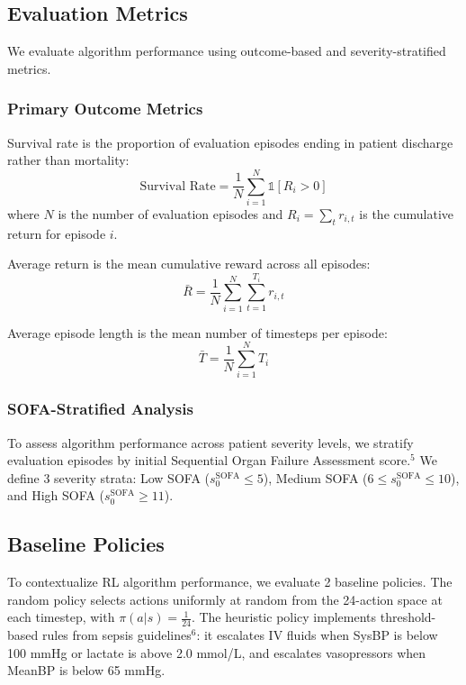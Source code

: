 \subsection{Evaluation Metrics}\label{sec:methods:eval}

We evaluate algorithm performance using outcome-based and severity-stratified metrics.

\subsubsection{Primary Outcome Metrics}

Survival rate is the proportion of evaluation episodes ending in patient discharge rather than mortality:
\begin{equation}
\text{Survival Rate} = \frac{1}{N} \sum_{i=1}^N \mathbb{1}[R_i > 0]
\end{equation}
where $N$ is the number of evaluation episodes and $R_i = \sum_t r_{i,t}$ is the cumulative return for episode $i$.

Average return is the mean cumulative reward across all episodes:
\begin{equation}
\bar{R} = \frac{1}{N} \sum_{i=1}^N \sum_{t=1}^{T_i} r_{i,t}
\end{equation}

Average episode length is the mean number of timesteps per episode:
\begin{equation}
\bar{T} = \frac{1}{N} \sum_{i=1}^N T_i
\end{equation}

\subsubsection{SOFA-Stratified Analysis}

To assess algorithm performance across patient severity levels, we stratify evaluation episodes by initial Sequential Organ Failure Assessment score.$^{5}$ We define 3 severity strata: Low SOFA ($s_0^{\text{SOFA}} \leq 5$), Medium SOFA ($6 \leq s_0^{\text{SOFA}} \leq 10$), and High SOFA ($s_0^{\text{SOFA}} \geq 11$).

\subsection{Baseline Policies}\label{sec:methods:baselines}

To contextualize RL algorithm performance, we evaluate 2 baseline policies. The random policy selects actions uniformly at random from the 24-action space at each timestep, with $\pi(a|s) = \frac{1}{24}$. The heuristic policy implements threshold-based rules from sepsis guidelines$^{6}$: it escalates IV fluids when SysBP is below 100 mmHg or lactate is above 2.0 mmol/L, and escalates vasopressors when MeanBP is below 65 mmHg.

